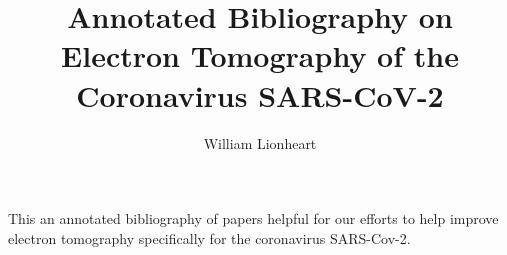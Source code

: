\documentclass[12pt]{article}
\title{Annotated Bibliography on Electron Tomography of the Coronavirus SARS-CoV-2}
\author{William Lionheart}
\begin{document}
		\maketitle


This an annotated bibliography of papers helpful for our efforts to help improve electron tomography specifically for the coronavirus SARS-Cov-2.
\nocite{*}



\end{document}
